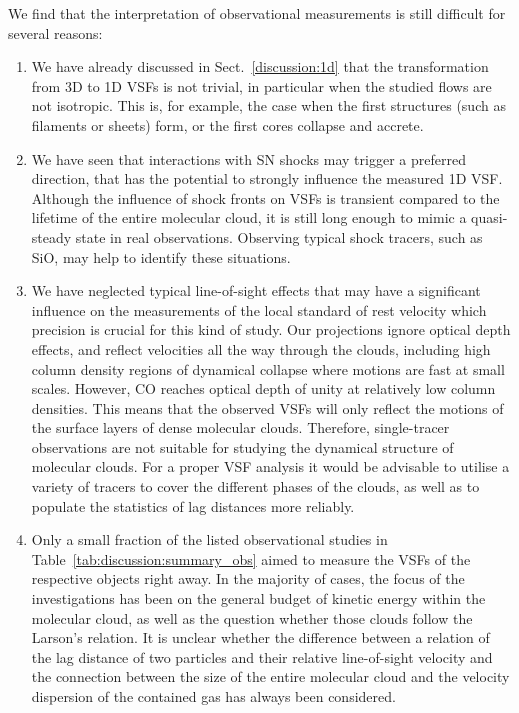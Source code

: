 We find that the interpretation of observational measurements is still difficult for several reasons:
\begin{enumerate}
\item We have already discussed in Sect.~\ref{discussion:1d} that the transformation from 3D to 1D VSFs is not trivial, in particular when the studied flows are not isotropic.
This is, for example, the case when the first structures (such as filaments or sheets) form, or the first cores collapse and accrete.
\item We have seen that interactions with SN shocks may trigger a preferred direction, that has the potential to strongly influence the measured 1D VSF.
Although the influence of shock fronts on VSFs is transient compared to the lifetime of the entire molecular cloud, it is still long enough to mimic a quasi-steady state in real observations.
Observing typical shock tracers, such as SiO, may help to identify these situations. 
\item We have neglected typical line-of-sight effects that may have a significant influence on the measurements of the local standard of rest velocity which precision is crucial for this kind of study.
Our projections ignore optical depth effects, and reflect velocities all the way through the clouds, including high column density regions of dynamical collapse where motions are fast at small scales.  However, CO reaches optical depth of unity at relatively low column densities. This means that the observed VSFs will only reflect the motions of the surface layers of dense molecular clouds.  
Therefore, single-tracer observations are not suitable for studying the dynamical structure of molecular clouds. 
For a proper VSF analysis it would be advisable to utilise a variety of tracers to cover the different phases of the clouds, as well as to populate the statistics of lag distances more reliably.
\item Only a small fraction of the listed observational studies in Table~\ref{tab:discussion:summary_obs} aimed to measure the VSFs of the respective objects right away.
In the majority of cases, the focus of the investigations has been on the general budget of kinetic energy within the molecular cloud, as well as the question whether those clouds follow the Larson's relation.
It is unclear whether the difference between a relation of the lag distance of two particles and their relative line-of-sight velocity and the connection between the size of the entire molecular cloud and the velocity dispersion of the contained gas has always been considered.
\end{enumerate}

